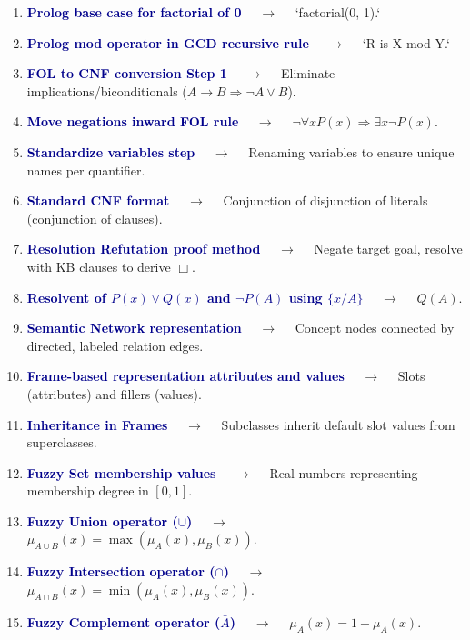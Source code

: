 \documentclass[11pt,a4paper]{article}
\begin{document}
\begin{enumerate}[label=\arabic*., leftmargin=*, labelsep=0.8em, itemsep=0.35em, parsep=0.1em, topsep=0.2em]
  \item \textcolor{darkblue}{\textbf{Prolog base case for factorial of 0}} $\quad\to\quad$ `factorial(0, 1).`
  \item \textcolor{darkblue}{\textbf{Prolog mod operator in GCD recursive rule}} $\quad\to\quad$ `R is X mod Y.`
  \item \textcolor{darkblue}{\textbf{FOL to CNF conversion Step 1}} $\quad\to\quad$ Eliminate implications/biconditionals ($A \rightarrow B \Rightarrow \neg A \lor B$).
  \item \textcolor{darkblue}{\textbf{Move negations inward FOL rule}} $\quad\to\quad$ $\neg \forall x P(x) \Longrightarrow \exists x \neg P(x)$.
  \item \textcolor{darkblue}{\textbf{Standardize variables step}} $\quad\to\quad$ Renaming variables to ensure unique names per quantifier.
  \item \textcolor{darkblue}{\textbf{Standard CNF format}} $\quad\to\quad$ Conjunction of disjunction of literals (conjunction of clauses).
  \item \textcolor{darkblue}{\textbf{Resolution Refutation proof method}} $\quad\to\quad$ Negate target goal, resolve with KB clauses to derive $\Box$.
  \item \textcolor{darkblue}{\textbf{Resolvent of $P(x) \lor Q(x)$ and $\neg P(A)$ using $\{x/A\}$}} $\quad\to\quad$ $Q(A)$.
  \item \textcolor{darkblue}{\textbf{Semantic Network representation}} $\quad\to\quad$ Concept nodes connected by directed, labeled relation edges.
  \item \textcolor{darkblue}{\textbf{Frame-based representation attributes and values}} $\quad\to\quad$ Slots (attributes) and fillers (values).
  \item \textcolor{darkblue}{\textbf{Inheritance in Frames}} $\quad\to\quad$ Subclasses inherit default slot values from superclasses.
  \item \textcolor{darkblue}{\textbf{Fuzzy Set membership values}} $\quad\to\quad$ Real numbers representing membership degree in $[0, 1]$.
  \item \textcolor{darkblue}{\textbf{Fuzzy Union operator ($\cup$)}} $\quad\to\quad$ $\mu_{A \cup B}(x) = \max(\mu_A(x), \mu_B(x))$.
  \item \textcolor{darkblue}{\textbf{Fuzzy Intersection operator ($\cap$)}} $\quad\to\quad$ $\mu_{A \cap B}(x) = \min(\mu_A(x), \mu_B(x))$.
  \item \textcolor{darkblue}{\textbf{Fuzzy Complement operator ($\bar{A}$)}} $\quad\to\quad$ $\mu_{\bar{A}}(x) = 1 - \mu_A(x)$.

\end{enumerate}
\end{document}

